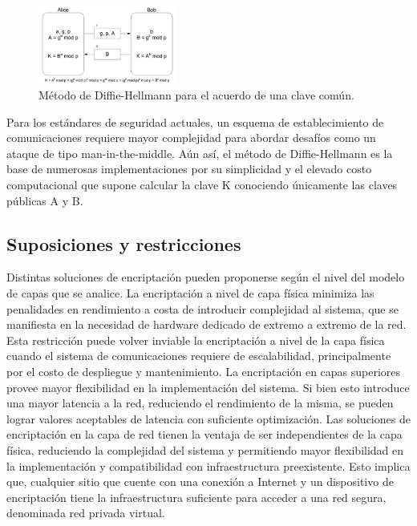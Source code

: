 
\begin{figure}[h!]
    \centering
    \includegraphics[width=0.4\textwidth]{../figs/1_diffie-hellmann.png}
    \caption{Método de Diffie-Hellmann para el acuerdo de una clave común.}
    \label{fig:diffie-hellmann}
\end{figure}

Para los estándares de seguridad actuales, un esquema de establecimiento de comunicaciones requiere mayor complejidad para abordar desafíos como un ataque de tipo man-in-the-middle. Aún así, el método de Diffie-Hellmann es la base de numerosas implementaciones por su simplicidad y el elevado costo computacional que supone calcular la clave K conociendo únicamente las claves públicas A y B.

\subsection{Suposiciones y restricciones}
Distintas soluciones de encriptación pueden proponerse según el nivel del modelo de capas que se analice. La encriptación a nivel de capa física minimiza las penalidades en rendimiento a costa de introducir complejidad al sistema, que se manifiesta en la necesidad de hardware dedicado de extremo a extremo de la red. Esta restricción puede volver inviable la encriptación a nivel de la capa física cuando el sistema de comunicaciones requiere de escalabilidad, principalmente por el costo de despliegue y mantenimiento.
La encriptación en capas superiores provee mayor flexibilidad en la implementación del sistema. Si bien esto introduce una mayor latencia a la red, reduciendo el rendimiento de la misma, se pueden lograr valores aceptables de latencia con suficiente optimización.  
Las soluciones de encriptación en la capa de red tienen la ventaja de ser independientes de la capa física, reduciendo la complejidad del sistema y permitiendo mayor flexibilidad en la implementación y compatibilidad con infraestructura preexistente. Esto implica que, cualquier sitio que cuente con una conexión a Internet y un dispositivo de encriptación tiene la infraestructura suficiente para acceder a una red segura, denominada red privada virtual.

